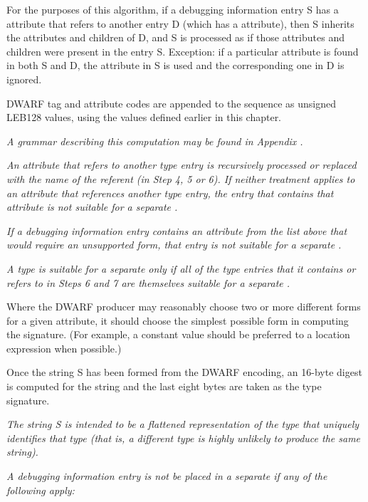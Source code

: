 For the purposes of this algorithm, if a debugging information
entry S has a 
\DWATspecification{} 
attribute that refers to
another entry D (which has a 
\DWATdeclaration{} 
attribute),
then S inherits the attributes and children of D, and S is
processed as if those attributes and children were present in
the entry S. Exception: if a particular attribute is found in
both S and D, the attribute in S is used and the corresponding
one in D is ignored.

DWARF tag and attribute codes are appended to the sequence
as unsigned LEB128 values, 
using the values defined earlier in this chapter.

\textit{A grammar describing this computation may be found in
Appendix .
}

\textit{An attribute that refers to another type entry is
recursively processed or replaced with the name of the
referent (in Step 4, 5 or 6). If neither treatment applies to
an attribute that references another type entry, the entry
that contains that attribute is not suitable for a
separate .}

\textit{If a debugging information entry contains an attribute from
the list above that would require an unsupported form, that
entry is not suitable for a separate 
.}

\textit{A type is suitable for a separate 
 only
if all of the type entries that it contains or refers to in
Steps 6 and 7 are themselves suitable for a separate
.}

Where the DWARF producer may reasonably choose two or more
different forms for a given attribute, it should choose
the simplest possible form in computing the signature. (For
example, a constant value should be preferred to a location
expression when possible.)

Once the string S has been formed from the DWARF encoding,
an 16-byte \MDfive{} digest is computed for the string and the 
last eight bytes are taken as the type signature.

\textit{The string S is intended to be a flattened representation of
the type that uniquely identifies that type (that is, a different
type is highly unlikely to produce the same string).}

\textit{A debugging information entry is not be placed in a
separate 
if any of the following apply:}


